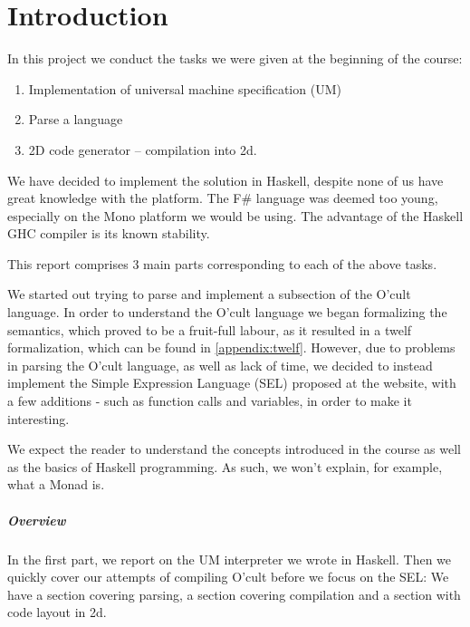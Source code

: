 \chapter{Introduction}

In this project we conduct the tasks we were given at the beginning of
the course:
\begin{enumerate}
\item Implementation of universal machine specification (UM)
\item Parse a language
\item 2D code generator -- compilation into 2d.
\end{enumerate}
We have decided to implement the solution in Haskell, despite none of
us have great knowledge with the platform. The F\# language was deemed
too young, especially on the Mono platform we would be using. The
advantage of the Haskell GHC compiler is its known stability.

This report comprises 3 main parts corresponding to each of the
above tasks.

We started out trying to parse and implement a subsection of the O'cult
language. In order to understand the O'cult language we began
formalizing the semantics, which proved to be a fruit-full labour, as
it resulted in a twelf formalization, which can be found in
\ref{appendix:twelf}. However, due to problems in parsing the O'cult
language, as well as lack of time, we decided to instead implement the
Simple Expression Language (SEL) proposed at the website, with a few
additions - such as function calls and variables, in order to make it interesting.

We expect the reader to understand the concepts introduced in the
course as well as the basics of Haskell programming. As such, we won't
explain, for example, what a Monad is.

\paragraph{Overview}
In the first part, we report on the UM interpreter we wrote in
Haskell. Then we quickly cover our attempts of compiling O'cult before
we focus on the SEL: We have a section covering parsing, a section
covering compilation and a section with code layout in 2d.

